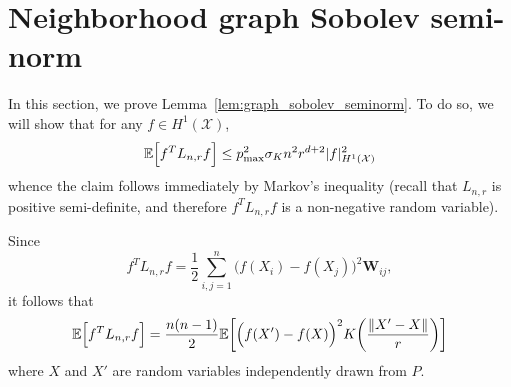 \documentclass{article}
\newcommand{\1}{\mathbf{1}}
\newcommand{\Lap}{L}
\newcommand{\Xset}{\mathcal{X}}
\newcommand{\Ebb}{\mathbb{E}}
\theoremstyle{alden}
\theoremstyle{aldenthm}
\theoremstyle{definition}
\theoremstyle{remark}
\begin{document}
\section{Neighborhood graph Sobolev semi-norm}
\label{sec:graph_sobolev_seminorm}
In this section, we prove Lemma~\ref{lem:graph_sobolev_seminorm}. To do so, we will show that for any $f \in H^1(\Xset)$,
\begin{equation*}
\Ebb\Bigl[f^T \Lap_{n,r} f\Bigr] \leq p_{\max}^2 \sigma_K n^2 r^{d + 2} |f|_{H^1(\Xset)}^2
\end{equation*}
whence the claim follows immediately by Markov's inequality (recall that $\Lap_{n,r}$ is positive semi-definite, and therefore $f^T \Lap_{n,r} f$ is a non-negative random variable).

Since
\begin{equation*}
f^T \Lap_{n,r} f = \frac{1}{2}\sum_{i, j = 1}^{n} \bigl(f(X_i) - f(X_j)\bigr)^2 \mathbf{W}_{ij},
\end{equation*}
it follows that
\begin{equation}
\label{pf:first_order_graph_sobolev_seminorm_1}
\Ebb\Bigl[f^T \Lap_{n,r} f\Bigr] = \frac{n(n - 1)}{2} \Ebb\biggl[\Bigl(f(X') - f(X)\Bigr)^2 K\biggl(\frac{\|X' - X\|}{r}\biggr)\biggr]
\end{equation}
where $X$ and $X'$ are random variables independently drawn from $P$. 
\end{document}
